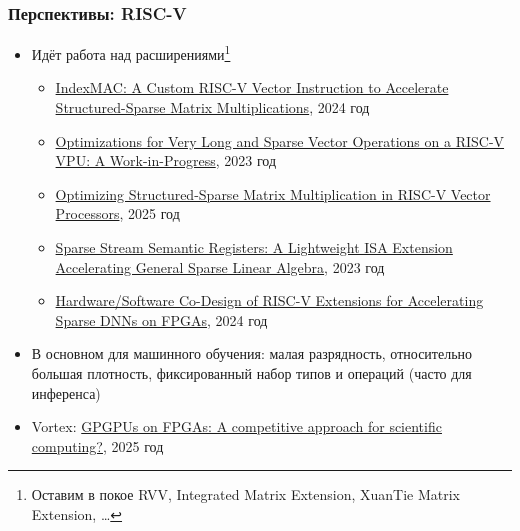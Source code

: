 \documentclass[xcolor=table,aspectratio=169]{beamer}
\begin{document}
\begin{frame}[fragile]
  \frametitle{Перспективы: RISC-V}
  \begin{itemize}
    \item Идёт работа над расширениями\footnote{Оставим в покое RVV, Integrated Matrix Extension, XuanTie Matrix Extension, \ldots}   
    \begin{itemize}
      \item \href{https://ieeexplore.ieee.org/abstract/document/10546747}{IndexMAC: A Custom RISC-V Vector Instruction to Accelerate Structured-Sparse Matrix Multiplications}, 2024 год
      \item \href{https://dl.acm.org/doi/abs/10.1007/978-3-031-40843-4_35}{Optimizations for Very Long and Sparse Vector Operations on a RISC-V VPU: A Work-in-Progress}, 2023 год
      \item \href{https://dl.acm.org/doi/10.1109/TC.2025.3533083}{Optimizing Structured-Sparse Matrix Multiplication in RISC-V Vector Processors}, 2025 год
      \item \href{https://ieeexplore.ieee.org/abstract/document/10271722}{Sparse Stream Semantic Registers: A Lightweight ISA Extension Accelerating General Sparse Linear Algebra}, 2023 год
      \item \href{https://ieeexplore.ieee.org/abstract/document/11113397}{Hardware/Software Co-Design of RISC-V Extensions for Accelerating Sparse DNNs on FPGAs}, 2024 год       
    \end{itemize}
    \item В основном для машинного обучения: малая разрядность, относительно большая плотность, фиксированный набор типов и операций (часто для инференса)
    \item Vortex: \href{https://cea.hal.science/cea-05043041v1/document}{GPGPUs on FPGAs: A competitive approach for scientific computing?}, 2025 год
  \end{itemize}
\end{frame}
\end{document}
